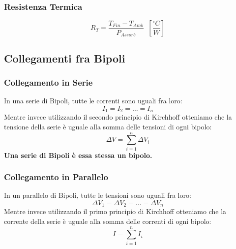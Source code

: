 \documentclass[../main.tex]{subfiles}
\begin{document}
	\subsubsection{Resistenza Termica}
	\begin{equation}
		R_T = \frac{T_{Fin} - T_{Amb}}{P_{Assorb}} \;\; \left[ \frac{^\circ C}{W}\right]
	\end{equation}
	\subsection{Collegamenti fra Bipoli}
	\subsubsection{Collegamento in Serie}
	In una serie di Bipoli, tutte le correnti sono uguali fra loro:
	\begin{equation}
		I_1 = I_2 = \dots = I_n
	\end{equation}
	Mentre invece utilizzando il secondo principio di Kirchhoff otteniamo che la tensione della serie è uguale alla somma delle tensioni di ogni bipolo:
	\begin{equation}
		\Delta V = \sum_{i = 1}^{n} \Delta V_i
	\end{equation}
	\textbf{Una serie di Bipoli è essa stessa un bipolo.}
	\subsubsection{Collegamento in Parallelo}
	In un parallelo di Bipoli, tutte le tensioni sono uguali fra loro:
	\begin{equation}
		\Delta V_1 = \Delta V_2 = \dots = \Delta V_n
	\end{equation}
	Mentre invece utilizzando il primo principio di Kirchhoff otteniamo che la corrente della serie è uguale alla somma delle correnti di ogni bipolo:
	\begin{equation}
		I = \sum_{i = 1}^{n} I_i
	\end{equation}
\end{document}
